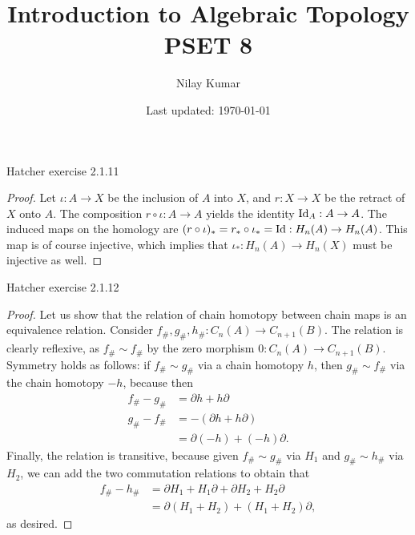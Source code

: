\documentclass{../../mathnotes}
\title{Introduction to Algebraic Topology PSET 8}
\author{Nilay Kumar}
\date{Last updated: \today}
\begin{document}
\maketitle

\begin{prop}
    Hatcher exercise 2.1.11 
\end{prop}
\begin{proof}
    Let $\iota:A\to X$ be the inclusion of $A$ into $X$, and $r:X\to X$ be the retract of $X$ onto $A$.
    The composition $r\circ \iota:A\to A$ yields the identity $\operatorname{Id}_A:A\to A$. The induced maps on the homology are
    $(r\circ\iota)_*=r_*\circ\iota_*=\operatorname{Id}:H_n(A)\to H_n(A)$. This map is of course injective, which implies that
    $\iota_*:H_n(A)\to H_n(X)$ must be injective as well.
\end{proof}

\begin{prop}
    Hatcher exercise 2.1.12
\end{prop}
\begin{proof}
    Let us show that the relation of chain homotopy between chain maps is an equivalence relation.
    Consider $f_\#,g_\#,h_\#:C_n(A)\to C_{n+1}(B)$. The relation is clearly reflexive, as $f_\#\sim f_\#$
    by the zero morphism $0:C_n(A)\to C_{n+1}(B)$. Symmetry holds as follows: if $f_\#\sim g_\#$ via a
    chain homotopy $h$, then $g_\#\sim f_\#$ via the chain homotopy $-h$, because then 
    \begin{align*}
        f_\#-g_\#&=\partial h+h\partial\\
        g_\#-f_\#&=-(\partial h+h\partial)\\
        &=\partial (-h)+(-h)\partial.
    \end{align*}
    Finally, the relation is transitive, because given $f_\#\sim g_\#$ via $H_1$ and $g_\#\sim h_\#$
    via $H_2$, we can add the two commutation relations to obtain that
    \begin{align*}
        f_\#-h_\#&=\partial H_1+H_1\partial+\partial H_2+H_2\partial\\
        &=\partial(H_1+H_2)+(H_1+H_2)\partial,
    \end{align*}
    as desired.
\end{proof}
\end{document}
